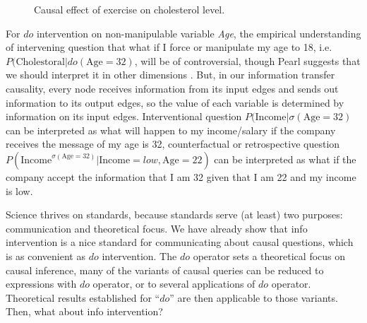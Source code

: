\begin{figure}[h]
	\centering
	\caption{Causal effect of exercise on cholesterol level.}
	\label{fig:exercise}
\end{figure}

For $do$ intervention on non-manipulable variable \emph{Age}, the empirical understanding of intervening question that what if I force or manipulate my age to 18,  i.e. $P(\mathrm{Cholestoral}|do(\mathrm{Age}=32)$, will be of controversial, though Pearl suggests that we should interpret it in other dimensions \cite{Pearl2019do}. But, in our information transfer causality, every node receives information from its input edges and sends out information to its output edges, so the value of each variable is determined by information on its input edges. Interventional question $P(\mathrm{Income}| \sigma(\mathrm{Age}=32)$ can be interpreted as  what will happen to my income/salary if the company receives the message of my age is 32, counterfactual or retrospective question $P(\mathrm{Income}^{\sigma(\mathrm{Age}=32)} | \mathrm{Income}=low, \mathrm{Age}=22)$  can be interpreted as what if the company accept the information that I am 32 given that I am 22 and my income is low.




Science thrives on standards, because standards serve (at least) two purposes: communication and theoretical focus. We have already show that info intervention is a nice standard for communicating about causal questions, {{which is as convenient as $do$ intervention}}. The $do$ operator sets a theoretical focus on causal inference, many of the variants of causal queries can be reduced to expressions with $do$ operator, or to several applications of $do$ operator. Theoretical results established for “$do$” are then applicable to those variants. Then, what about info intervention?

